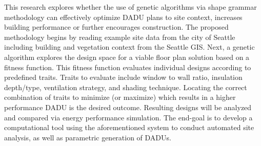This research explores whether the use of genetic algorithms via shape grammar methodology can effectively optimize DADU plans to site context, increases building performance or further encourages construction. The proposed methodology begins by reading example site data from the city of Seattle including building and vegetation context from the Seattle GIS. Next, a genetic algorithm explores the design space for a viable floor plan solution based on a fitness function. This fitness function evaluates individual designs according to predefined traits. Traits to evaluate include window to wall ratio, insulation depth/type, ventilation strategy, and shading technique. Locating the correct combination of traits to minimize (or maximize) which results in a higher performance DADU is the desired outcome. Resulting designs will be analyzed and compared via energy performance simulation. The end-goal is to develop a computational tool using the aforementioned system to conduct automated site analysis, as well as parametric generation of DADUs.